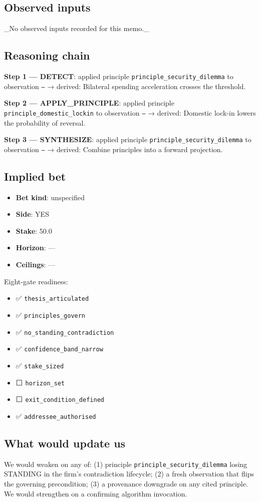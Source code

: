 \subsection*{Observed inputs}
\_No observed inputs recorded for this memo.\_

\subsection*{Reasoning chain}
\textbf{Step 1 — DETECT}: applied principle \texttt{principle\_security\_dilemma} to observation \texttt{—} → derived: Bilateral spending acceleration crosses the threshold.

\textbf{Step 2 — APPLY\_PRINCIPLE}: applied principle \texttt{principle\_domestic\_lockin} to observation \texttt{—} → derived: Domestic lock-in lowers the probability of reversal.

\textbf{Step 3 — SYNTHESIZE}: applied principle \texttt{principle\_security\_dilemma} to observation \texttt{—} → derived: Combine principles into a forward projection.

\subsection*{Implied bet}
\begin{itemize}
\item \textbf{Bet kind}: unspecified
\item \textbf{Side}: YES
\item \textbf{Stake}: 50.0
\item \textbf{Horizon}: —
\item \textbf{Ceilings}: —
\end{itemize}

Eight-gate readiness:
\begin{itemize}
\item ✅ \texttt{thesis\_articulated}
\item ✅ \texttt{principles\_govern}
\item ✅ \texttt{no\_standing\_contradiction}
\item ✅ \texttt{confidence\_band\_narrow}
\item ✅ \texttt{stake\_sized}
\item ⬜ \texttt{horizon\_set}
\item ⬜ \texttt{exit\_condition\_defined}
\item ✅ \texttt{addressee\_authorised}
\end{itemize}

\subsection*{What would update us}
We would weaken on any of: (1) principle \texttt{principle\_security\_dilemma} losing STANDING in the firm's contradiction lifecycle; (2) a fresh observation that flips the governing precondition; (3) a provenance downgrade on any cited principle. We would strengthen on a confirming algorithm invocation.

